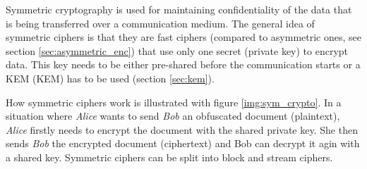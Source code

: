 Symmetric cryptography is used for maintaining confidentiality of the data that is being transferred over a communication medium. The general idea of symmetric ciphers is that they are fast ciphers (compared to asymmetric ones, see section \ref{sec:asymmetric_enc}) that use only one secret (private key) to encrypt data. This key needs to be either pre-shared before the communication starts or a KEM ({\acl{KEM}}) has to be used (section \ref{sec:kem}).

How symmetric ciphers work is illustrated with figure \ref{img:sym_crypto}. In a situation where \textit{Alice} wants to send \textit{Bob} an obfuscated document (plaintext), \textit{Alice} firstly needs to encrypt the document with the shared private key. She then sends \textit{Bob} the encrypted document (ciphertext) and Bob can decrypt it agin with a shared key. Symmetric ciphers can be split into block and stream ciphers.



